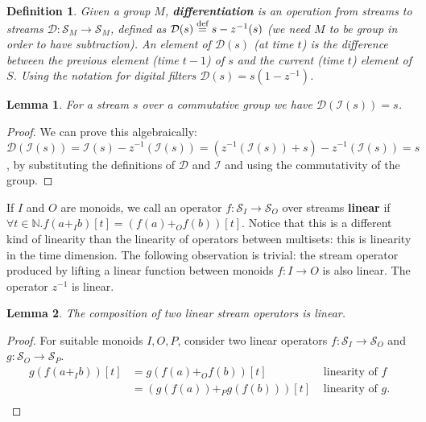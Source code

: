 \documentclass[10pt]{article}
\newtheorem{lemma}{Lemma}[section]
\newtheorem{definition}{Definition}[section]
\newcommand{\N}{\mathbb{N}}  %
\newcommand{\stream}[1]{\ensuremath{\mathcal{S}_{#1}}}
\newcommand{\zm}{\ensuremath{z^{-1}}} %
\newcommand{\I}{\mathcal{I}}  %
\newcommand{\D}{\mathcal{D}}  %
\newcommand{\defn}{\stackrel{\textrm{\scriptsize def}}{=}}
\begin{document}
\begin{definition}
Given a group $M$, \textbf{differentiation} is an operation from
streams to streams $\D : \stream{M} \rightarrow \stream{M}$, defined
as $\D(s) \defn s - \zm(s)$ (we need $M$ to be group in order to have
subtraction).  An element of $\D(s)$ (at time $t$) is the difference
between the previous element (time $t-1$) of $s$ and the current (time
$t$) element of $S$.  Using the notation for digital filters $\D(s) =
s(1 - \zm)$.

\end{definition}

\begin{lemma}
For a stream $s$ over a commutative group we have $\D(\I(s)) = s$.
\end{lemma}
\begin{proof}
  We can prove this algebraically: $\D(\I(s)) = \I(s) - \zm(\I(s)) =
  (\zm(\I(s)) + s) - \zm(\I(s)) = s$, by substituting the definitions
  of $\D$ and $\I$ and using the commutativity of the group.
\end{proof}

If $I$ and $O$ are monoids, we call an operator $f: \stream{I}
\rightarrow \stream{O}$ over streams \textbf{linear} if $\forall t \in
\N . f(a +_I b)[t] = (f(a) +_O f(b))[t]$.  Notice that this is a
different kind of linearity than the linearity of operators between
multisets: this is linearity in the time dimension.  The following
observation is trivial: the stream operator produced by lifting a
linear function between monoids $f: I \rightarrow O$ is also linear.
The operator $\zm$ is linear.

\begin{lemma}
  The composition of two linear stream operators is linear.
\end{lemma}
\begin{proof}
  For suitable monoids $I, O, P$, consider two linear operators $f:
  \stream{I} \rightarrow \stream{O}$ and $g: \stream{O} \rightarrow
  \stream{P}$.
$$
\begin{aligned}
  g(f(a +_I b))[t] &= g(f(a) +_O f(b))[t] & \mbox{ linearity of }f \\
  &= (g(f(a)) +_P g(f(b)))[t] & \mbox{ linearity of }g. \\
\end{aligned}
$$
\end{proof}
\end{document}
